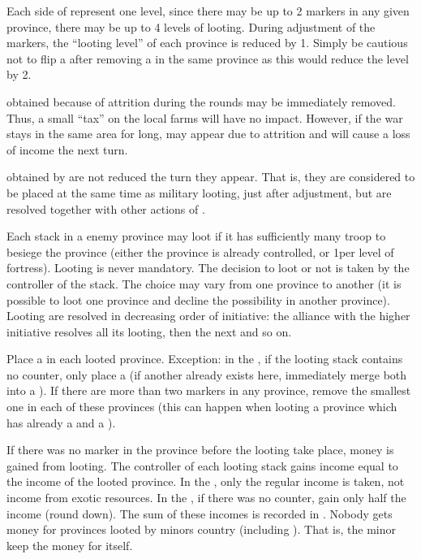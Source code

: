 \begin{designnote}
  Each side of \PILLAGE represent one level, since there may be up to 2
  markers in any given province, there may be up to 4 levels of
  looting. During adjustment of the markers, the ``looting level'' of each
  province is reduced by 1. Simply be cautious not to flip a \PILLAGE\Faceplus
  after removing a \PILLAGE\Facemoins in the same province as this would
  reduce the level by 2.

  \smallskip

  \PILLAGE obtained because of attrition during the rounds may be immediately
  removed. Thus, a small ``tax'' on the local farms will have no
  impact. However, if the war stays in the same area for long,
  \PILLAGE\Faceplus may appear due to attrition and will cause a loss of
  income the next turn.

  \smallskip

  \PILLAGE obtained by \corsaire are not reduced the turn they appear. That
  is, they are considered to be placed at the same time as military looting,
  just after adjustment, but are resolved together with other actions of
  \corsaire.
\end{designnote}

\aparag[Looting]
\bparag Each stack in a enemy province may loot if it has sufficiently many
troop to besiege the province (either the province is already controlled, or
1\LD per level of fortress).
\bparag Looting is never mandatory.
\bparag The decision to loot or not is taken by the controller of the
stack. The choice may vary from one province to another (it is possible to
loot one province and decline the possibility in another province).
\bparag Looting are resolved in decreasing order of initiative: the alliance
with the higher initiative resolves all its looting, then the next and so on.

\bparag Place a \PILLAGE\Faceplus in each looted province.
\bparag Exception: in the \ROTW, if the looting stack contains no \ARMY
counter, only place a \PILLAGE\Facemoins (if another already exists here,
immediately merge both into a \PILLAGE\Faceplus).
\bparag If there are more than two \PILLAGE markers in any province, remove
the smallest one in each of these provinces (this can happen when looting a
province which has already a \PILLAGE\Faceplus and a \PILLAGE\Facemoins).

\bparag If there was no \PILLAGE marker in the province before the looting
take place, money is gained from looting.
\bparag The controller of each looting stack gains income equal to the income
of the looted province.
\bparag In the \ROTW, only the regular income is taken, not income from exotic
resources.
\bparag In the \ROTW, if there was no \ARMY counter, gain only half the
income (round down).
\bparag The sum of these incomes is recorded in .
\bparag Nobody gets money for provinces looted by minors country (including
\VASSAL). That is, the minor keep the money for itself.


